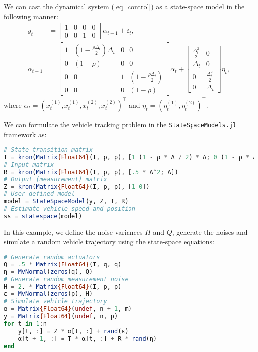 \documentclass{juliacon}
\begin{document}
We can cast the dynamical system (\ref{eq_control}) as a state-space model in the following manner:
\begin{align*} 
    y_t &= \begin{bmatrix} 1 & 0 & 0 & 0 \\ 0 & 0 & 1 & 0 \end{bmatrix} \alpha_{t+1} + \varepsilon_t, \\
    \alpha_{t+1} &= \begin{bmatrix} 1 & (1 - \tfrac{\rho \Delta_t}{2}) \Delta_t & 0 & 0 \\ 0 & (1 - \rho) & 0 & 0 \\ 0 & 0 & 1 & (1 - \tfrac{\rho \Delta_t}{2}) \\ 0 & 0 & 0 & (1 - \rho) \end{bmatrix} \alpha_{t} + \begin{bmatrix} \tfrac{\Delta^2_t}{2} & 0 \\ \Delta_t & 0 \\ 0 & \tfrac{\Delta^2_t}{2} \\ 0 & \Delta_t \end{bmatrix} \eta_{t},
\end{align*}
where $\alpha_t = (x_t^{(1)}, \dot{x}^{(1)}_{t}, x_t^{(2)}, \dot{x}^{(2)}_{t})^{\top}$ and $\eta_t = (\eta^{(1)}_t, \eta^{(2)}_t)^{\top}$.

\vspace{0.3cm}

We can formulate the vehicle tracking problem in the \texttt{StateSpaceModels.jl} framework as:

\begin{lstlisting}[language = Julia]
# State transition matrix
T = kron(Matrix{Float64}(I, p, p), [1 (1 - ρ * Δ / 2) * Δ; 0 (1 - ρ * Δ)])
# Input matrix
R = kron(Matrix{Float64}(I, p, p), [.5 * Δ^2; Δ])
# Output (measurement) matrix
Z = kron(Matrix{Float64}(I, p, p), [1 0])
# User defined model
model = StateSpaceModel(y, Z, T, R)
# Estimate vehicle speed and position
ss = statespace(model)
\end{lstlisting}

In this example, we define the noise variances $H$ and $Q$, generate the noises and simulate a random vehicle trajectory using the state-space equations:
%
\begin{lstlisting}[language = Julia]
# Generate random actuators
Q = .5 * Matrix{Float64}(I, q, q)
η = MvNormal(zeros(q), Q)
# Generate random measurement noise
H = 2. * Matrix{Float64}(I, p, p)
ε = MvNormal(zeros(p), H)
# Simulate vehicle trajectory
α = Matrix{Float64}(undef, n + 1, m)
y = Matrix{Float64}(undef, n, p)
for t in 1:n
    y[t, :] = Z * α[t, :] + rand(ε)
    α[t + 1, :] = T * α[t, :] + R * rand(η)  
end
\end{lstlisting}
\end{document}
